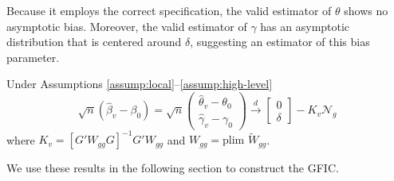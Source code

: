 Because it employs the correct specification, the valid estimator of $\theta$ shows no asymptotic bias.
Moreover, the valid estimator of $\gamma$ has an asymptotic distribution that is centered around $\delta$, suggesting an estimator of this bias parameter.
\begin{cor}
\label{cor:valid}
Under Assumptions \ref{assump:local}--\ref{assump:high-level}
		$$\sqrt{n}\left( \widehat{\beta}_v - \beta_0 \right) = \sqrt{n}\left(\begin{array}{c} \widehat{\theta}_v - \theta_0\\ \widehat{\gamma}_v - \gamma_0\end{array} \right) \overset{d}{\rightarrow}  \left[\begin{array}{c} 0\\ \delta\end{array}\right] -K_v \mathscr{N}_g$$
where $K_v = \left[G'W_{gg}G\right]^{-1}G'W_{gg}$ and $W_{gg} = \mbox{plim }\widetilde{W}_{gg}$.
\end{cor}
We use these results in the following section to construct the GFIC.

